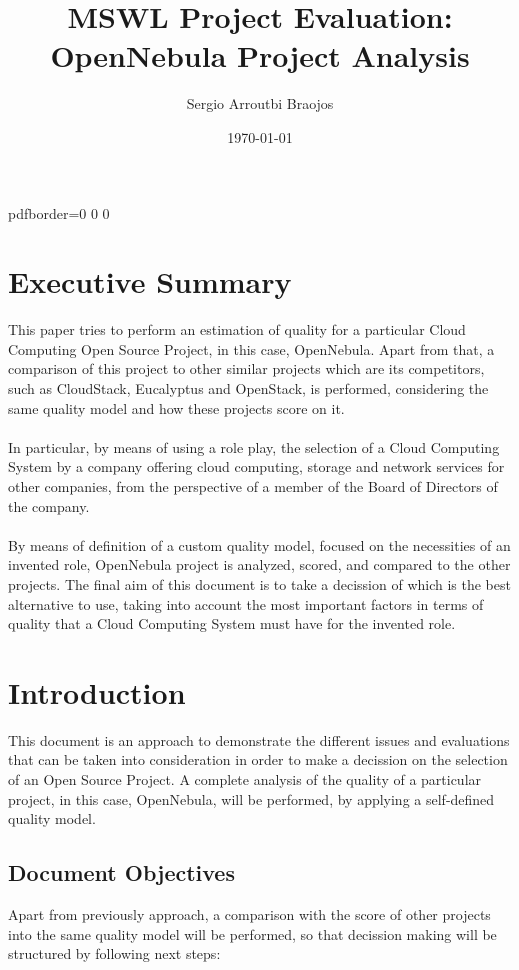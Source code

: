\documentclass[11pt]{article}
\title{\textbf{MSWL Project Evaluation: OpenNebula Project Analysis}}
\author{Sergio Arroutbi Braojos}
\date{\today}
\begin{document}
\hypersetup
{   
pdfborder={0 0 0}
}
   
\maketitle

\tableofcontents
\listoftables

\pagebreak

\section{Executive Summary}
This paper tries to perform an estimation of quality for a particular Cloud Computing Open Source Project, in this case, OpenNebula. Apart from that, a comparison of this project to other similar projects which are its competitors, such as CloudStack, Eucalyptus and OpenStack, is performed, considering the same quality model and how these projects score on it.\\
\\
In particular, by means of using a role play, the selection of a Cloud Computing System by a company offering cloud computing, storage and network services for other companies, from the perspective of a member of the Board of Directors of the company.\\
\\
By means of definition of a custom quality model, focused on the necessities of an invented role, OpenNebula project is analyzed, scored, and compared to the other projects. The final aim of this document is to take a decission of which is the best alternative to use, taking into account the most important factors in terms of quality that a Cloud Computing System must have for the invented role.

\section{Introduction} \label{sec:introduction}
This document is an approach to demonstrate the different issues and evaluations that can be taken into consideration in order to make a decission on the selection of an Open Source Project. A complete analysis of the quality of a particular project, in this case, OpenNebula, will be performed, by applying a self-defined quality model. 

\subsection{Document Objectives}
Apart from previously approach, a comparison with the score of other projects into the same quality model will be performed, so that decission making will be structured by following next steps:
\end{document}
